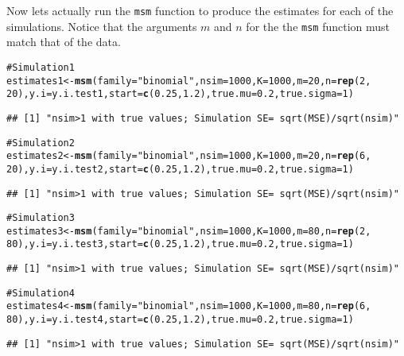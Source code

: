 \documentclass{article}\usepackage{graphicx, color}
\makeatletter
\newcommand{\hlfunctioncall}[1]{\textcolor[rgb]{0.501960784313725,0,0.329411764705882}{\textbf{#1}}}%
\newcommand{\hlstring}[1]{\textcolor[rgb]{0.6,0.6,1}{#1}}%
\newcommand{\hlcomment}[1]{\textcolor[rgb]{0.180392156862745,0.6,0.341176470588235}{#1}}%
\newenvironment{kframe}{%
 \def\at@end@of@kframe{}%
 \ifinner\ifhmode%
  \def\at@end@of@kframe{\end{minipage}}%
  \begin{minipage}{\columnwidth}%
 \fi\fi%
 \def\FrameCommand##1{\hskip\@totalleftmargin \hskip-\fboxsep
 \colorbox{shadecolor}{##1}\hskip-\fboxsep
     \hskip-\linewidth \hskip-\@totalleftmargin \hskip\columnwidth}%
 \MakeFramed {\advance\hsize-\width
   \@totalleftmargin\z@ \linewidth\hsize
   \@setminipage}}%
 {\par\unskip\endMakeFramed%
 \at@end@of@kframe}
\newenvironment{knitrout}{}{} %
\makeatother
\begin{document}
Now lets actually run the {\tt msm} function to produce the estimates for each of the simulations.  Notice that the arguments $m$ and $n$ for the the {\tt msm} function must match that of the data.\\

\begin{knitrout}\footnotesize
{}\color{fgcolor}\begin{kframe}
\begin{alltt}
\hlcomment{# Simulation 1}
estimates1 <- \hlfunctioncall{msm}(family = \hlstring{"binomial"}, nsim = 1000, K = 1000, m = 20, n = \hlfunctioncall{rep}(2, 
    20), y.i = y.i.test1, start = \hlfunctioncall{c}(0.25, 1.2), true.mu = 0.2, true.sigma = 1)
\end{alltt}
\begin{verbatim}
## [1] "nsim>1 with true values; Simulation SE= sqrt(MSE)/sqrt(nsim)"
\end{verbatim}
\begin{alltt}

\hlcomment{# Simulation 2}
estimates2 <- \hlfunctioncall{msm}(family = \hlstring{"binomial"}, nsim = 1000, K = 1000, m = 20, n = \hlfunctioncall{rep}(6, 
    20), y.i = y.i.test2, start = \hlfunctioncall{c}(0.25, 1.2), true.mu = 0.2, true.sigma = 1)
\end{alltt}
\begin{verbatim}
## [1] "nsim>1 with true values; Simulation SE= sqrt(MSE)/sqrt(nsim)"
\end{verbatim}
\begin{alltt}

\hlcomment{# Simulation 3}
estimates3 <- \hlfunctioncall{msm}(family = \hlstring{"binomial"}, nsim = 1000, K = 1000, m = 80, n = \hlfunctioncall{rep}(2, 
    80), y.i = y.i.test3, start = \hlfunctioncall{c}(0.25, 1.2), true.mu = 0.2, true.sigma = 1)
\end{alltt}
\begin{verbatim}
## [1] "nsim>1 with true values; Simulation SE= sqrt(MSE)/sqrt(nsim)"
\end{verbatim}
\begin{alltt}

\hlcomment{# Simulation 4}
estimates4 <- \hlfunctioncall{msm}(family = \hlstring{"binomial"}, nsim = 1000, K = 1000, m = 80, n = \hlfunctioncall{rep}(6, 
    80), y.i = y.i.test4, start = \hlfunctioncall{c}(0.25, 1.2), true.mu = 0.2, true.sigma = 1)
\end{alltt}
\begin{verbatim}
## [1] "nsim>1 with true values; Simulation SE= sqrt(MSE)/sqrt(nsim)"
\end{verbatim}
\begin{alltt}


\end{alltt}
\end{kframe}
\end{knitrout}
\end{document}
